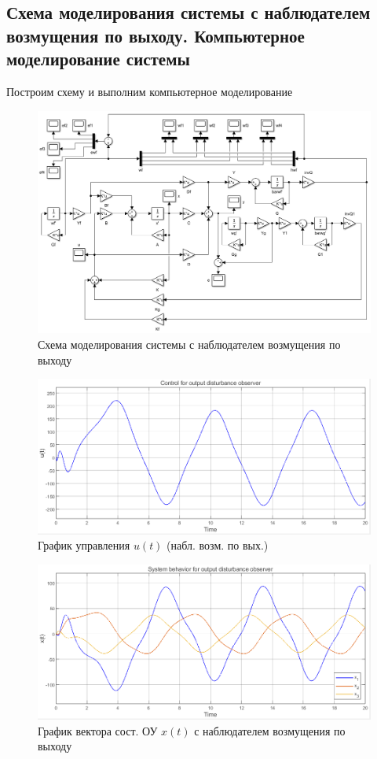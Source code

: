 \documentclass[a4paper, 12pt]{article}
\begin{document}
    \subsection{Схема моделирования системы с наблюдателем возмущения по
    выходу. Компьютерное моделирование системы}
    Построим схему и выполним компьютерное моделирование
    \begin{figure}[H]
        \centering
        \includegraphics[scale=0.5]{3task_scheme_2.png}
        \captionsetup{skip=0pt}
        \caption{Схема моделирования системы с наблюдателем возмущения по выходу}
        \label{fig:3task_scheme_2}
    \end{figure}
    \begin{figure}[H]
        \centering
        \includegraphics[scale=0.6]{3task_u2.png}
        \captionsetup{skip=0pt}
        \caption{График управления $u(t)$ (набл. возм. по вых.)}
        \label{fig:3task_u2}
    \end{figure}
    \begin{figure}[H]
        \centering
        \includegraphics[scale=0.6]{3task_x2.png}
        \captionsetup{skip=0pt}
        \caption{График вектора сост. ОУ $x(t)$ с наблюдателем возмущения по выходу}
        \label{fig:3task_x2}
    \end{figure}
\end{document}
